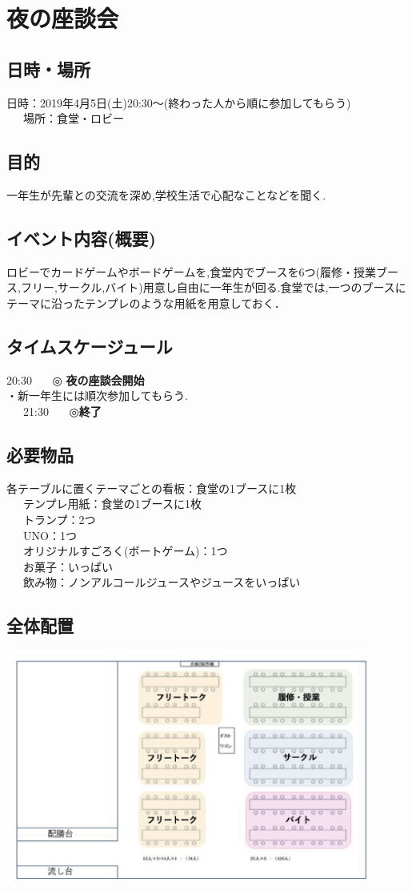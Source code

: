 
\section{夜の座談会}
\subsection{日時・場所}
日時：2019年4月5日(土)20:30〜(終わった人から順に参加してもらう)\\
\ \ \ 場所：食堂・ロビー\\
\subsection{目的}
一年生が先輩との交流を深め,学校生活で心配なことなどを聞く.
\subsection{イベント内容(概要)}
ロビーでカードゲームやボードゲームを,食堂内でブースを6つ(履修・授業ブース,フリー,サークル,バイト)用意し自由に一年生が回る.食堂では,一つのブースに
テーマに沿ったテンプレのような用紙を用意しておく．
\subsection{タイムスケージュール}
20:30 \ \ \ ◎ \textbf{夜の座談会開始}\\
\hspace{15mm}・新一年生には順次参加してもらう.\\
\ \ \ 21:30 \ \ \ ◎\textbf{終了}
\subsection{必要物品}
各テーブルに置くテーマごとの看板：食堂の1ブースに1枚\\
\ \ \ テンプレ用紙：食堂の1ブースに1枚\\
\ \ \ トランプ：2つ\\
\ \ \ UNO：1つ\\
\ \ \ オリジナルすごろく(ボートゲーム)：1つ\\
\ \ \ お菓子：いっぱい\\
\ \ \ 飲み物：ノンアルコールジュースやジュースをいっぱい
\subsection{全体配置}
\begin{center}
\includegraphics[width=12cm]{./13/hone.eps}
\end{center}

